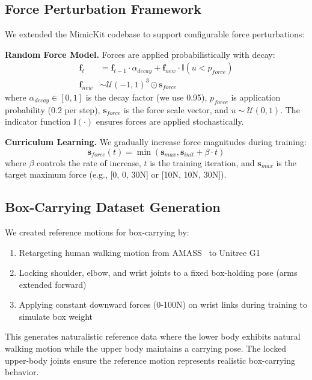 \documentclass{article}
\begin{document}
\subsection{Force Perturbation Framework}

We extended the MimicKit codebase to support configurable force perturbations:

\textbf{Random Force Model.} Forces are applied probabilistically with decay:
\begin{align}
\mathbf{f}_t &= \mathbf{f}_{t-1} \cdot \alpha_{decay} + \mathbf{f}_{new} \cdot \mathbb{I}(u < p_{force}) \label{eq:force_decay}\\
\mathbf{f}_{new} &\sim \mathcal{U}(-1, 1)^3 \odot \mathbf{s}_{force} \label{eq:force_sample}
\end{align}
where $\alpha_{decay} \in [0,1]$ is the decay factor (we use 0.95), $p_{force}$ is application probability (0.2 per step), $\mathbf{s}_{force}$ is the force scale vector, and $u \sim \mathcal{U}(0,1)$. The indicator function $\mathbb{I}(\cdot)$ ensures forces are applied stochastically.

\textbf{Curriculum Learning.} We gradually increase force magnitudes during training:
\begin{equation}
\mathbf{s}_{force}(t) = \min(\mathbf{s}_{max}, \mathbf{s}_{init} + \beta \cdot t)
\label{eq:curriculum}
\end{equation}
where $\beta$ controls the rate of increase, $t$ is the training iteration, and $\mathbf{s}_{max}$ is the target maximum force (e.g., [0, 0, 30N] or [10N, 10N, 30N]).

\subsection{Box-Carrying Dataset Generation}

We created reference motions for box-carrying by:
\begin{enumerate}
\item Retargeting human walking motion from AMASS~\citep{mahmood2019amass} to Unitree G1
\item Locking shoulder, elbow, and wrist joints to a fixed box-holding pose (arms extended forward)
\item Applying constant downward forces (0-100N) on wrist links during training to simulate box weight
\end{enumerate}

This generates naturalistic reference data where the lower body exhibits natural walking motion while the upper body maintains a carrying pose. The locked upper-body joints ensure the reference motion represents realistic box-carrying behavior.
\end{document}
